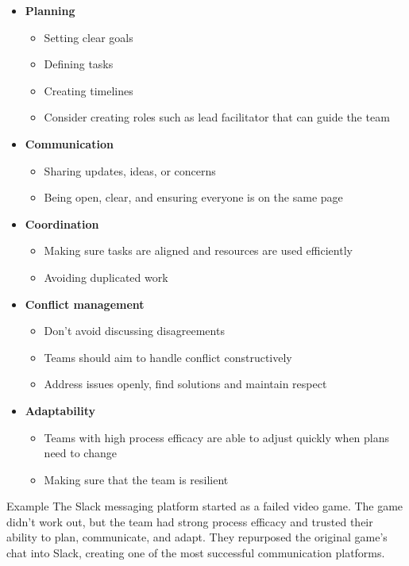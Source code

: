 \documentclass{report}
\begin{document}
		\begin{itemize}
			\item \textbf{Planning}
				\begin{itemize}
					\item Setting clear goals
					\item Defining tasks
					\item Creating timelines
					\item Consider creating roles such as lead facilitator that can guide the team
				\end{itemize}
			\item \textbf{Communication}
				\begin{itemize}
					\item Sharing updates, ideas, or concerns
					\item Being open, clear, and ensuring everyone is on the same page
				\end{itemize}
			\item \textbf{Coordination}
				\begin{itemize}
					\item Making sure tasks are aligned and resources are used efficiently
					\item Avoiding duplicated work
				\end{itemize}
			\item \textbf{Conflict management}
				\begin{itemize}
					\item Don't avoid discussing disagreements
					\item Teams should aim to handle conflict constructively
					\item Address issues openly, find solutions and maintain respect
				\end{itemize}
			\item \textbf{Adaptability}
				\begin{itemize}
					\item Teams with high process efficacy are able to adjust quickly when plans need to change
					\item Making sure that the team is resilient
				\end{itemize}
		\end{itemize}

		\begin{question}{Example}
			The Slack messaging platform started as a failed video game. The game didn't work out, but the team had strong process efficacy and trusted their ability to plan, communicate, and adapt. They repurposed the original game's chat into Slack, creating one of the most successful communication platforms.
		\end{question}
\end{document}
